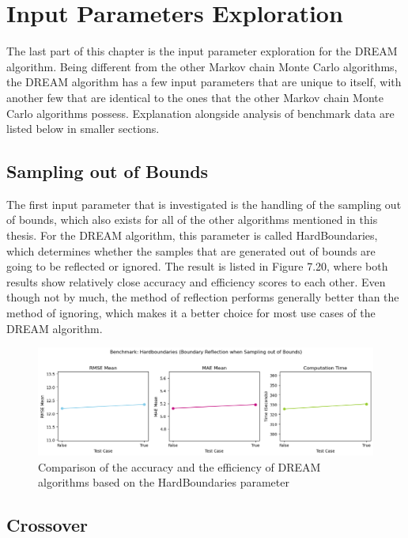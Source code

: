 \section{Input Parameters Exploration}
The last part of this chapter is the input parameter exploration for the DREAM algorithm. Being different from the other Markov chain Monte Carlo algorithms, the DREAM algorithm has a few input parameters that are unique to itself, with another few that are identical to the ones that the other Markov chain Monte Carlo algorithms possess. Explanation alongside analysis of benchmark data are listed below in smaller sections. 

\subsection{Sampling out of Bounds}
The first input parameter that is investigated is the handling of the sampling out of bounds, which also exists for all of the other algorithms mentioned in this thesis. For the DREAM algorithm, this parameter is called HardBoundaries, which determines whether the samples that are generated out of bounds are going to be reflected or ignored. The result is listed in Figure 7.20, where both results show relatively close accuracy and efficiency scores to each other. Even though not by much, the method of reflection performs generally better than the method of ignoring, which makes it a better choice for most use cases of the DREAM algorithm.

\begin{figure}[H]
    \centering
    \includegraphics[width=1\textwidth]{figures/dream/sotb.png}
    \captionsetup{width=.8\textwidth}
    \caption{Comparison of the accuracy and the efficiency of DREAM algorithms based on the HardBoundaries parameter}
    \label{fig:enter-label}
\end{figure}

\subsection{Crossover}

